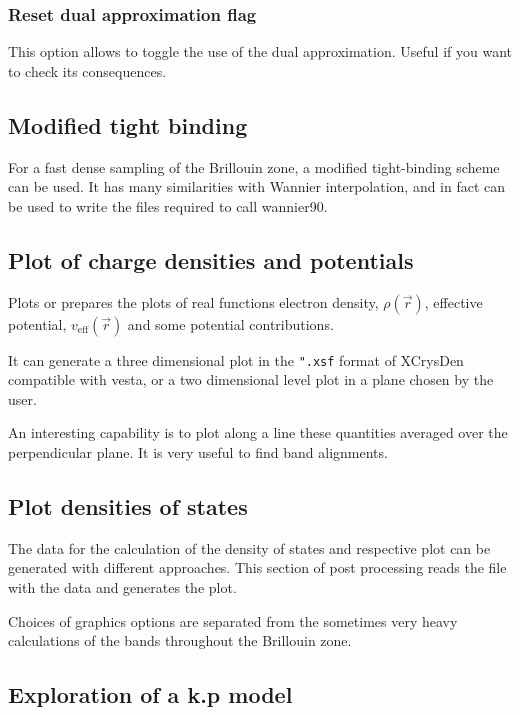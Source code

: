 \documentclass[11pt]{article}
\begin{document}
\subsubsection{Reset dual approximation flag}

This option allows to toggle the use of the dual approximation.
Useful if you want to check its consequences.



\subsection{Modified tight binding}

For a fast dense sampling of the Brillouin zone, a modified tight-binding scheme
can be used.  It has many similarities with Wannier interpolation, and in fact
can be used to write the files required to call {\sc wannier90}.

\subsection{Plot of charge densities and potentials}

Plots or prepares the plots of real functions electron density, $\rho(\vec r)$, effective potential,
$v_\text{eff}(\vec r)$ and some potential contributions.

It can generate a three dimensional plot in the \texttt{".xsf} format of {\sc XCrysDen}
compatible with {\sc vesta}, or a two dimensional level plot in a plane chosen by the user.

An interesting capability is to plot along a line these quantities averaged over the
perpendicular plane.  It is very useful to find band alignments.

\subsection{Plot densities of states}

The data for the calculation of the density of states and respective plot
can be generated with different approaches.  This section of
post processing reads the file with the data and generates the plot.

Choices of graphics options are separated from the sometimes very heavy calculations of
the bands throughout the Brillouin zone.

\subsection{Exploration of a k.p model}
\end{document}
